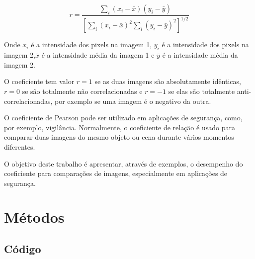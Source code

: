 \documentclass[10pt,a4paper]{article}
\begin{document}
\begin{equation}r = \frac{  
\displaystyle{\sum_{i} (x_i-\bar{x})(y_i-  
\bar{y})}}{\displaystyle{\left[  
\sum_{i}(x_i-\bar{x})^2  
\sum_{i}(y_i-\bar{y})^2\right]^{1/2}}}  
\end{equation}  

Onde $x_i$ é a intensidade dos pixels na imagem 1, $y_i$ é a
intensidade dos pixels na imagem 2,$\bar{x}$ é a intensidade média da
imagem 1 e $\bar{y}$ é a intensidade média da imagem 2.

O coeficiente tem valor $r=1$ se as duas imagens são absolutamente
idênticas, $r=0$ se são totalmente não correlacionadas e $r=-1$ se elas
são totalmente anti-correlacionadas, por exemplo se uma imagem é o
negativo da outra.

O coeficiente de Pearson pode ser utilizado em
aplicações de segurança, como, por exemplo, vigilância. Normalmente, 
o coeficiente de relação é usado para comparar duas imagens do mesmo
objeto ou cena durante vários momentos diferentes.

O objetivo deste trabalho é apresentar, através de exemplos, o
desempenho do coeficiente para comparações de imagens, especialmente
em aplicações de segurança.

\section{Métodos}



\subsection{Código}

\newpage
\end{document}

